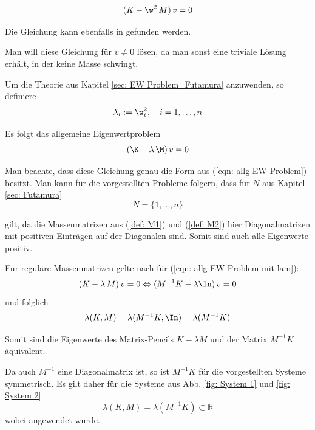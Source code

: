 \documentclass[a4paper,12pt]{report}
\newcommand{\R}{\mathbb R}
\newcommand{\inv}{^{-1}}
\newcommand{\1}{\mathds{1}}
\theoremstyle{plain} %
\theoremstyle{definition} %
\theoremstyle{remark}
\begin{document}
            \begin{equation}
                  \label{eqn: allg EW Problem mit w}
                  (K-\w^2\,M)\,v = 0
            \end{equation}

            Die Gleichung kann ebenfalls in \cite[S. 380]{maschinendynamikDresig} gefunden werden.

            Man will diese Gleichung für $v\ne 0$ lösen, da man sonst eine triviale Lösung erhält, in der keine Masse schwingt.

            Um die Theorie aus Kapitel \ref{sec: EW Problem_Futamura} anzuwenden, so definiere
            $$\lambda_i := \w_i^2,\quad i=1,\dots,n$$

            Es folgt das allgemeine Eigenwertproblem
            \begin{equation}
                  \label{eqn: allg EW Problem mit lam}
                  (\K-\lambda\,\M)\,v = 0
            \end{equation}

            Man beachte, dass diese Gleichung genau die Form aus (\ref{eqn: allg EW Problem}) besitzt.
            Man kann für die vorgestellten Probleme folgern, dass für $N$ aus Kapitel \ref{sec: Futamura}
            $$N=\{1,\dots,n\}$$

            gilt, da die Massenmatrizen aus (\ref{def: M1}) und (\ref{def: M2}) hier Diagonalmatrizen mit positiven Einträgen auf der Diagonalen sind. Somit sind auch alle Eigenwerte positiv.

            Für reguläre Massenmatrizen gelte nach \cite[S. 376]{matrixGolub} für (\ref{eqn: allg EW Problem mit lam}):
            $$(K-\lambda\,M)\,v = 0 \Leftrightarrow (M\inv K-\lambda\In)\,v=0$$
            und folglich
            $$\lambda(K, M) =\lambda(M\inv K,\In) = \lambda(M\inv K)$$

            Somit sind die Eigenwerte des Matrix-Pencils $K-\lambda M$ und der Matrix $M\inv K$ äquivalent.

            Da auch $M\inv$ eine Diagonalmatrix ist, so ist $M\inv K$ für die vorgestellten Systeme symmetrisch.
            Es gilt daher für die Systeme aus Abb. \ref{fig: System 1} und \ref{fig: System 2}
            \begin{equation}
                  \label{eqn: alle Ew reell}
                  \lambda(K, M) = \lambda(M\inv K) \subset \R
            \end{equation}
            wobei \cite[S. 393]{matrixGolub} angewendet wurde.
\end{document}
